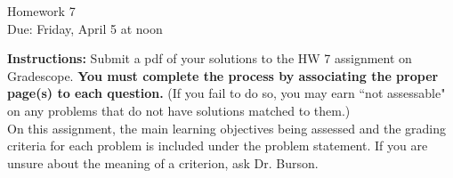 \documentclass[12pt]{article}
\begin{document}
\begin{center}
{\Large Homework 7}\\
Due: Friday,  April 5 at noon\\


\end{center}
{\bf Instructions:} Submit a pdf of your solutions to the HW 7 assignment on Gradescope.  {\bf You must complete the process by associating the proper page(s) to each question.} (If you fail to do so, you may earn ``not assessable" on any problems that do not have solutions matched to them.)\\[3pt]

On this assignment, the main learning objectives being assessed and the grading criteria for each problem is included under the problem statement.  If you are unsure about the meaning of a criterion, ask Dr. Burson.  
\end{document}
